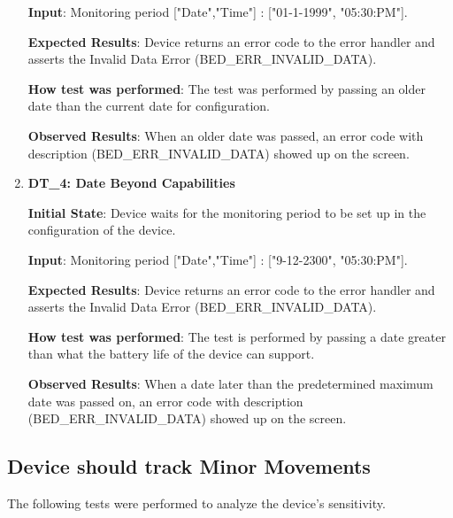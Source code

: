 \documentclass[12pt, titlepage]{article}
\begin{document}
\begin{enumerate}
  \textbf{Input}: Monitoring period ["Date","Time"] : ["01-1-1999", "05:30:PM"].

  \textbf{Expected Results}: Device returns an error code to the error handler and asserts the Invalid Data Error (BED\_ERR\_INVALID\_DATA).

  \textbf{How test was performed}: The test was performed by passing an older date than the current date for configuration.

  \textbf{Observed Results}: When an older date was passed, an error code with description (BED\_ERR\_INVALID\_DATA) showed up on the screen.

  \item{\textbf{DT\_4: Date Beyond Capabilities}\\}\label{DT4}

  \textbf{Initial State}: Device waits for the monitoring period to be set up in the configuration of the device.

  \textbf{Input}: Monitoring period ["Date","Time"] : ["9-12-2300", "05:30:PM"].

  \textbf{Expected Results}: Device returns an error code to the error handler and asserts the Invalid Data Error (BED\_ERR\_INVALID\_DATA).

  \textbf{How test was performed}: The test is performed by passing a date greater than what the battery life of the device can support.

  \textbf{Observed Results}: When a date later than the predetermined maximum date was passed on, an error code with description (BED\_ERR\_INVALID\_DATA) showed up on the screen.
\end{enumerate}

\subsection{Device should track Minor Movements}
The following tests were performed to analyze the device's sensitivity.
\end{document}
